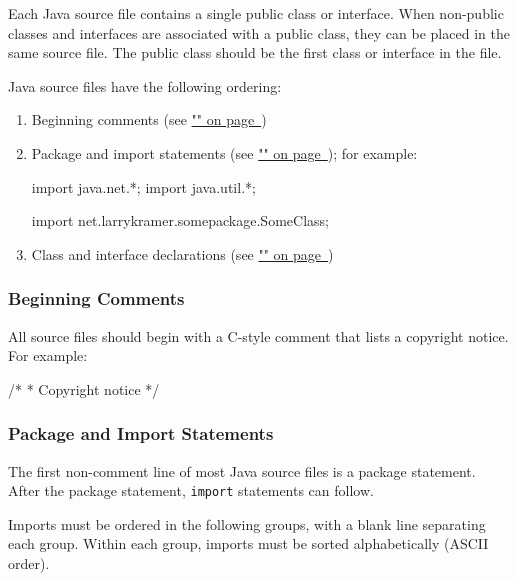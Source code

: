 \documentclass{article}
\begin{document}
Each Java source file contains a single public class or interface. When non-public classes and
interfaces are associated with a public class, they can be placed in the same source file. The
public class should be the first class or interface in the file.

Java source files have the following ordering:

\begin{enumerate}
\item Beginning comments (see \hyperref[beginningcomments]{"" on
  page~\pageref*{beginningcomments}})
\item Package and import statements (see \hyperref[packagesimports]{"" on
  page~\pageref*{packagesimports}}); for example: \\
\begin{snippet}
import java.net.*;
import java.util.*;

import net.larrykramer.somepackage.SomeClass;
\end{snippet}
\item Class and interface declarations (see
  \hyperref[classesinterfaces]{"" on page~\pageref*{classesinterfaces}})
\end{enumerate}

\subsubsection{Beginning Comments}
\label{beginningcomments}

All source files should begin with a C-style comment that lists a copyright notice. For example:

\begin{snippet}
/*
 * Copyright notice
 */
\end{snippet}

\subsubsection{Package and Import Statements}
\label{packagesimports}

The first non-comment line of most Java source files is a package statement. After the package
statement, \texttt{import} statements can follow.

Imports must be ordered in the following groups, with a blank line separating each group. Within
each group, imports must be sorted alphabetically (ASCII order).
\end{document}
